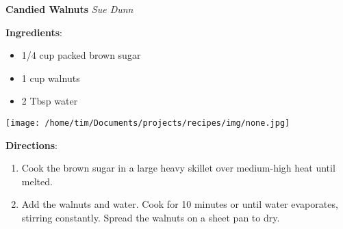 \documentclass[11pt, twoside, openany]{book}
\begin{document}
\noindent\begin{minipage}[t]{\linewidth}%
{\Large\textbf{Candied Walnuts}} \label{candied-walnuts}\hfill\textit{Sue Dunn}\\
\noindent\begin{minipage}[t]{0.78\linewidth}%
\textbf{Ingredients}:\vspace{-3mm}
\begin{multicols}{2}
\begin{itemize}\setlength\itemsep{-1mm}
\item 1/4 cup packed brown sugar
\item 1 cup walnuts
\item 2 Tbsp water
\end{itemize}
\end{multicols}
\end{minipage}
\noindent\begin{minipage}[t]{0.18\linewidth}
\centering \strut\vspace*{-\baselineskip}\newline
\texttt{[image: /home/tim/Documents/projects/recipes/img/none.jpg]}\\
\end{minipage}\vspace{3mm}
\textbf{Directions}:
\vspace{-3mm}\begin{enumerate}\setlength\itemsep{-1mm}
\item Cook the brown sugar in a large heavy skillet over medium-high heat until melted.
\item Add the walnuts and water. Cook for 10 minutes or until water evaporates, stirring constantly. Spread the walnuts on a sheet pan to dry.
\end{enumerate}
\end{minipage}\vspace{8mm}
\end{document}
